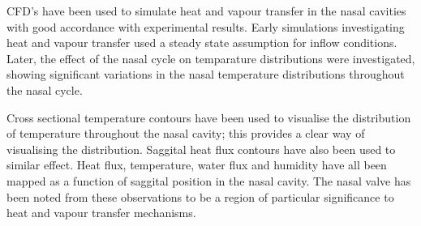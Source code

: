 CFD's have been used to simulate heat and vapour transfer in the nasal cavities with good accordance with experimental results\cite{Lindemann2004}. Early simulations investigating heat and vapour transfer used a steady state assumption for inflow conditions\cite{Naftali1998}. Later, the effect of the nasal cycle on temparature distributions were investigated, showing significant variations in the nasal temperature distributions throughout the nasal cycle\cite{Elad2006}.

Cross sectional temperature contours have been used to visualise the distribution of temperature throughout the nasal cavity; this provides a clear way of visualising the distribution\cite{Naftali2005}. Saggital heat flux contours have also been used to similar effect\cite{Sullivan2013}. Heat flux, temperature, water flux and humidity have all been mapped as a function of saggital position in the nasal cavity\cite{Garcia2007, Sullivan2013, Yu2014}. The nasal valve has been noted from these observations to be a region of particular significance to heat and vapour transfer mechanisms\cite{Sulivan2013}. 




%
%
%
%
%
%
%
%
%
%
%
%
%
%
%
%
%
%


